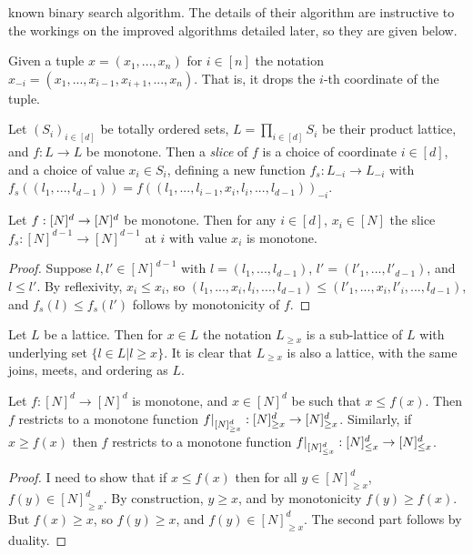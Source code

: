 known binary search algorithm. The details of their algorithm are instructive
to the workings on the improved algorithms detailed  later, so they are given below.
\begin{notation}
  Given a tuple $x = (x_1, ..., x_n)$ for $i \in [n]$ the notation $x_{-i} = (x_1, ..., x_{i-1}, x_{i+1}, ..., x_n)$. That is, it drops
  the $i$-th coordinate of the tuple.
\end{notation}
\begin{definition}[Slice]
  Let $(S_i)_{i \in [d]}$ be totally ordered sets, $L = \prod_{i \in [d]} S_i$
  be their product lattice, and $f : L \to L$ be monotone. 
  Then a \emph{slice} of $f$ is a choice of coordinate $i \in [d]$,
  and a choice of value $x_i \in S_i$, defining a new function 
  $f_s : L_{-i} \to L_{-i}$ with
  $f_s((l_1, ..., l_{d-1})) = f((l_1, ..., l_{i-1},  x_i, l_i, ..., l_{d-1}))_{-i}$.
\end{definition}
\begin{lemma}
  Let $f : [N]^d \to [N]^d$ be monotone. Then for any $i \in [d]$, $x_i \in [N]$ the slice $f_s : [N]^{d-1} \to [N]^{d-1}$ at $i$ with value $x_i$  
  is monotone. 
\end{lemma}
\begin{proof}
  Suppose $l, l' \in [N]^{d-1}$ with $l = (l_1, ..., l_{d-1})$, $l' = (l'_1, ..., l'_{d-1})$, and $l \leq l'$.
  By reflexivity, $x_i \leq x_i$, so $(l_1, ... , x_i, l_i, ..., l_{d-1}) \leq (l'_1, ... , x_i, l'_i, ..., l_{d-1})$,
  and $f_s(l) \leq f_s(l')$ follows by monotonicity of $f$.
\end{proof}
\begin{notation}
  Let $L$ be a lattice. Then for $x \in L$ the notation $L_{\geq x}$ is a sub-lattice of $L$ with underlying set
  $\{l \in L | l \geq x\}$. It is clear that $L_{\geq x}$ is also a lattice, with the same joins, meets, and ordering as $L$.
\end{notation}
\begin{lemma}\label{restricts}
  Let $f : [N]^d \to [N]^d$ is monotone, and $x \in [N]^d$ be such that $x \leq f(x)$. Then
  $f$ restricts to a monotone function $\restr{f}{[N]^d_{\geq x}} : [N]^d_{\geq x} \to [N]^d_{\geq x}$. Similarly,
  if $x \geq f(x)$ then $f$ restricts to a monotone function $\restr{f}{[N]^d_{\leq x}} : [N]^d_{\leq x} \to [N]^d_{\leq x}$.
\end{lemma}
\begin{proof}
  I need to show that if $x \leq f(x)$ then for all $y \in [N]^d_{\geq x}$, $f(y) \in [N]^d_{\geq x}$. By construction,
  $y \geq x$, and by monotonicity $f(y) \geq f(x)$. But $f(x) \geq x$, so $f(y) \geq x$, and $f(y) \in [N]^d_{\geq x}$. The second part
  follows by duality.
\end{proof}
